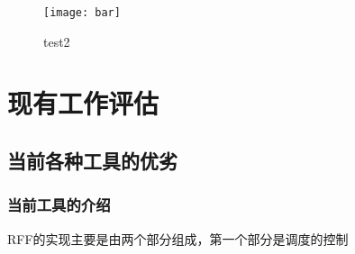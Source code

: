 \begin{figure}[ht]
    \centering
    \texttt{[image: bar]}
    \caption{\label{fig:test2}test2}
\end{figure}

\section{现有工作评估}

\subsection{当前各种工具的优劣}

\subsubsection{当前工具的介绍}

RFF的实现主要是由两个部分组成，第一个部分是调度的控制